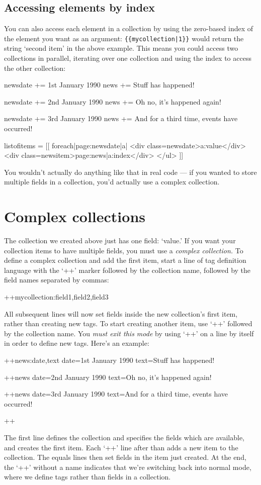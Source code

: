 \subsection{Accessing elements by index}
\label{collbyindex}
You can also access each element in a collection by using the zero-based index of the
element you want as an argument: \verb,{{mycollection|1}}, would return the
string `second item' in the above example. This means you could access two
collections in parallel, iterating over one collection and using the index
to access the other collection:

\begin{MyVerbatim}
newsdate += 1st January 1990
news += Stuff has happened!

newsdate += 2nd January 1990
news += Oh no, it's happened again!

newsdate += 3rd January 1990
news += And for a third time, events have occurred!

listofitems = [[
   {{foreach|{{page:newsdate}}|a|
        <div class=newsdate>{{a:value}}</div>
        <div class=newsitem>{{page:news|{{a:index}}}}</div>
    }}
   </ul>
]]
\end{MyVerbatim}

You wouldn't actually do anything like that in real code --- if you wanted
to store multiple fields in a collection, you'd actually use a complex
collection.

\clearpage
\section{Complex collections}
The collection we created above just has one field: `value.' If you want your collection items
to have multiple fields, you must use a \emph{complex collection.}
To define a complex collection and add the first item, start a line of tag definition language with the `++'
marker followed by the collection name, followed by the field names separated by commas:
\begin{MyVerbatim}
++mycollection:field1,field2,field3
\end{MyVerbatim}
All subsequent lines will now set fields inside the new collection's first item,
rather than creating new tags.
To start creating another item, use `++' followed by the collection name.
You \emph{must exit this mode} by using `++' on a line by itself in order to define new tags. Here's an
example:
\begin{MyVerbatim}
++news:date,text
date=1st January 1990
text=Stuff has happened!

++news
date=2nd January 1990
text=Oh no, it's happened again!

++news
date=3rd January 1990
text=And for a third time, events have occurred!

++
\end{MyVerbatim}
The first line defines the collection and specifies the fields which are available, and creates
the first item. Each `++' line after than adds a new item to the collection. The equals lines
then set fields in the item just created.
At the end, the `++' without a name indicates that we're switching back
into normal mode, where we define tags rather than fields in a collection.


